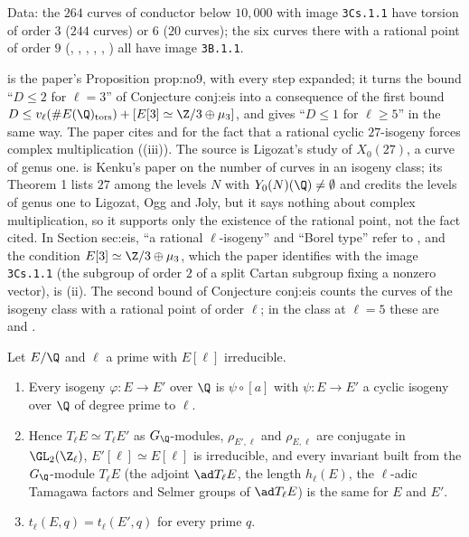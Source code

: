 \noindent Data: the $264$ curves of conductor below $10{,}000$ with image \texttt{3Cs.1.1} have torsion of order $3$ ($244$ curves) or $6$ ($20$ curves); the six curves there with a rational point of
order $9$ (, , , , , ) all have image \texttt{3B.1.1}.

\begin{paperlink}\label{pl:ellcurves:eis}
 is the paper's Proposition prop:no9, with every step expanded; it turns the bound ``$D\le2$ for $\ell=3$'' of Conjecture conj:eis into a consequence of the first bound
$D\le v_\ell(\#E(\Q)_{\mathrm{tors}})+[E[3]\simeq\Z/3\oplus\mu_3]$, and gives ``$D\le1$ for $\ell\ge5$'' in the same way. The paper cites \cite{Ligozat75} and \cite{Kenku} for the fact that a rational cyclic
$27$-isogeny forces complex multiplication ((iii)). The source is Ligozat's study of $X_0(27)$, a curve of genus one.
\cite{Kenku} is Kenku's paper on the number of curves in an isogeny class; its Theorem 1 lists $27$ among the levels $N$ with $Y_0(N)(\Q)\ne\emptyset$ and credits the levels of genus one to
Ligozat, Ogg and Joly, but it says nothing about complex multiplication, so it supports only the existence of the rational point, not the fact cited. In Section sec:eis, ``a rational $\ell$-isogeny'' and ``Borel type'' refer to ,
and the condition $E[3]\simeq\Z/3\oplus\mu_3$, which the paper identifies with the image \texttt{3Cs.1.1} (the subgroup of order $2$ of a split Cartan subgroup fixing a nonzero vector), is
(ii).
The second bound of Conjecture conj:eis counts the curves of the isogeny class with a rational point of order $\ell$; in the class  at $\ell=5$ these are  and .
\end{paperlink}

\begin{lemma}\label{lem:ellcurves:primetol}
Let $E/\Q$ and $\ell$ a prime with $E[\ell]$ irreducible.
\begin{enumerate}[label=(\roman*)]
\item Every isogeny $\varphi\colon E\to E'$ over $\Q$ is $\psi\circ[a]$ with $\psi\colon E\to E'$ a cyclic isogeny over $\Q$ of degree prime to $\ell$.
\item Hence $T_\ell E\simeq T_\ell E'$ as $G_\Q$-modules, $\rho_{E',\ell}$ and $\rho_{E,\ell}$ are conjugate in $\GL_2(\Z_\ell)$, $E'[\ell]\simeq E[\ell]$ is irreducible, and every invariant built from the
$G_\Q$-module $T_\ell E$ (the adjoint $\ad T_\ell E$, the length $h_\ell(E)$, the $\ell$-adic Tamagawa factors and Selmer groups of $\ad T_\ell E$) is the same for $E$ and $E'$.
\item $t_\ell(E,q)=t_\ell(E',q)$ for every prime $q$.
\end{enumerate}
\end{lemma}

